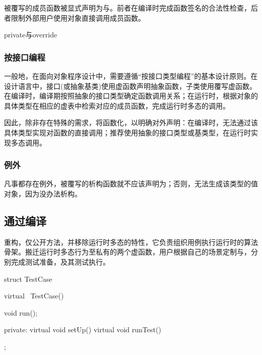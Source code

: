 \begin{content}
被覆写的成员函数被显式声明为与。前者在编译时完成函数签名的合法性检查，后者限制外部用户使用对象直接调用成员函数。

\begin{episode}{private与override}
\begin{content}

\subsubsection{按接口编程}

一般地，在面向对象程序设计中，需要遵循“按接口类型编程”的基本设计原则。在设计语言中，接口(或抽象基类)使用虚函数声明抽象函数，子类使用覆写虚函数。在编译时，编译期按照抽象的接口类型确定函数调用关系；在运行时，根据对象的具体类型在相应的虚表中检索对应的成员函数，完成运行时多态的调用。

因此，除非存在特殊的需求，将函数化，以明确对外声明：在编译时，无法通过该具体类型实现对函数的直接调用；推荐使用抽象的接口类型或基类型，在运行时实现多态调用。

\subsubsection{例外}

凡事都存在例外，被覆写的析构函数就不应该声明为；否则，无法生成该类型的值对象，因为没办法析构。

\end{content}
\end{episode}

\subsection{通过编译}

重构，仅公开方法，并移除运行时多态的特性，它负责组织用例执行运行时的算法骨架。搬迁运行时多态行为至私有的两个虚函数，用户根据自己的场景定制与，分别完成测试准备，及其测试执行。

\begin{leftbar}
 \begin{c++}[caption={\ttfamily{include/mars/core/TestCase.h}}]
struct TestCase {
  virtual ~TestCase() {}

  void run();

private:
  virtual void setUp() {}
  virtual void runTest() {}
};
  \end{c++}
\end{leftbar}


\end{content}
